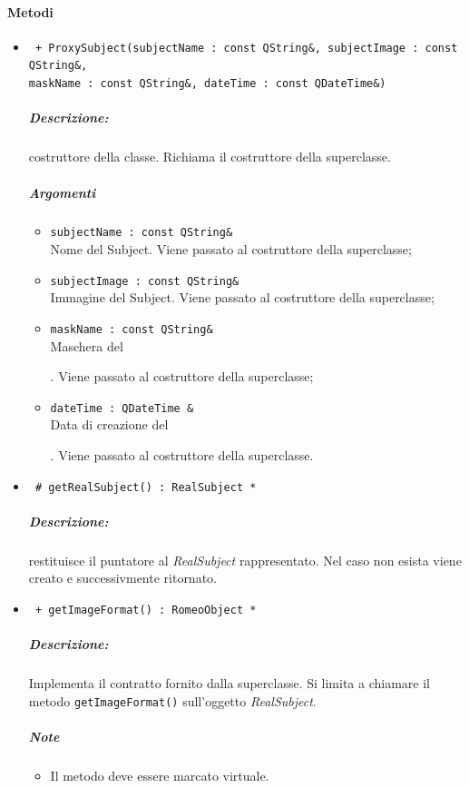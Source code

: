 \paragraph{Metodi \\}
	\begin{itemize}
		\item  \color{blue}\verb! + ProxySubject(subjectName : const QString&, subjectImage : const QString&, !\\
			\verb!maskName : const QString&, dateTime : const QDateTime&)!
			\color{black}
			\subparagraph{Descrizione:} costruttore della classe. Richiama il costruttore della superclasse.
			\subparagraph{Argomenti}
				\begin{itemize}
					\item \color{RoyalPurple}\verb!subjectName : const QString&!\\
					\color{black}Nome del Subject\g{}. Viene passato al costruttore della superclasse;
					
					\item \color{RoyalPurple}\verb!subjectImage : const QString&!\\
					\color{black}Immagine del Subject\g{}. Viene passato al costruttore della superclasse;
					
					\item \color{RoyalPurple}\verb!maskName : const QString&!\\
					\color{black}Maschera\g{} del \subject{}. Viene passato al costruttore della superclasse;
					
					\item \color{RoyalPurple}\verb!dateTime : QDateTime &!\\
					\color{black}Data di creazione del \subject{}. Viene passato al costruttore della superclasse.
				\end{itemize}
		
		\item \color{blue}\verb! # getRealSubject() : RealSubject *!
		\color{black}
		\subparagraph{Descrizione:} restituisce il puntatore al \textsl{RealSubject} rappresentato. Nel caso non esista viene creato e successivmente ritornato.
		
		\item \color{blue}\verb! + getImageFormat() : RomeoObject *!
		\color{black}
		\subparagraph{Descrizione:} Implementa il contratto fornito dalla superclasse. Si limita a chiamare il metodo \verb!getImageFormat()! sull'oggetto \textsl{RealSubject}.
		
		\subparagraph{Note}
			\begin{itemize}
				\item Il metodo deve essere marcato virtuale.
			\end{itemize}
			
	\end{itemize}


